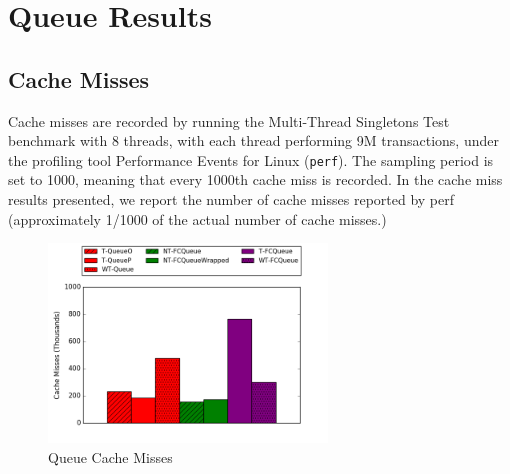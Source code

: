 \chapter{Queue Results}
\label{app:queues}

\vspace{-20pt}
\section{Cache Misses}

Cache misses are recorded by running the Multi-Thread Singletons Test benchmark with 8 threads, with each thread performing 9M transactions, under the profiling tool Performance Events for Linux (\texttt{perf}). The sampling period is set to 1000, meaning that every 1000th cache miss is recorded.
In the cache miss results presented, we report the number of cache misses reported by perf (approximately 1/1000 of the actual number of cache misses.)

\begin{figure}[H]
    \centering
    \includegraphics[width=0.66\textwidth]{fcqueues/cm.png}
    \caption{Queue Cache Misses}
\label{fig:cm_queues}
\end{figure}


